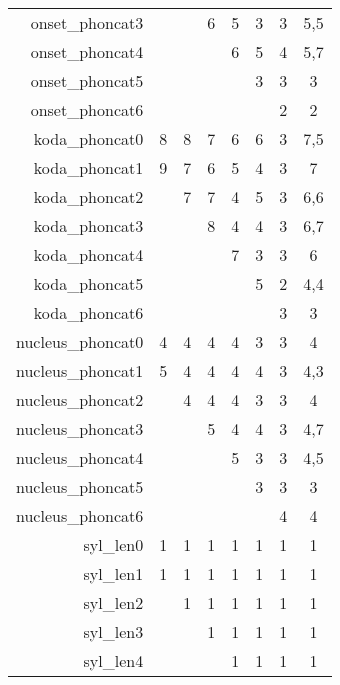 \begin{longtable}{|r|llllll|c|}
    onset\_phoncat3   & ~    & ~    & 6    & 5    & 3    & 3    & 5,5      \\
    onset\_phoncat4   & ~    & ~    & ~    & 6    & 5    & 4    & 5,7      \\
    onset\_phoncat5   & ~    & ~    & ~    & ~    & 3    & 3    & 3        \\
    onset\_phoncat6   & ~    & ~    & ~    & ~    & ~    & 2    & 2        \\
    koda\_phoncat0    & 8    & 8    & 7    & 6    & 6    & 3    & 7,5      \\
    koda\_phoncat1    & 9    & 7    & 6    & 5    & 4    & 3    & 7        \\
    koda\_phoncat2    & ~    & 7    & 7    & 4    & 5    & 3    & 6,6      \\
    koda\_phoncat3    & ~    & ~    & 8    & 4    & 4    & 3    & 6,7      \\
    koda\_phoncat4    & ~    & ~    & ~    & 7    & 3    & 3    & 6        \\
    koda\_phoncat5    & ~    & ~    & ~    & ~    & 5    & 2    & 4,4      \\
    koda\_phoncat6    & ~    & ~    & ~    & ~    & ~    & 3    & 3        \\
    nucleus\_phoncat0 & 4    & 4    & 4    & 4    & 3    & 3    & 4        \\
    nucleus\_phoncat1 & 5    & 4    & 4    & 4    & 4    & 3    & 4,3      \\
    nucleus\_phoncat2 & ~    & 4    & 4    & 4    & 3    & 3    & 4        \\
    nucleus\_phoncat3 & ~    & ~    & 5    & 4    & 4    & 3    & 4,7      \\
    nucleus\_phoncat4 & ~    & ~    & ~    & 5    & 3    & 3    & 4,5      \\
    nucleus\_phoncat5 & ~    & ~    & ~    & ~    & 3    & 3    & 3        \\
    nucleus\_phoncat6 & ~    & ~    & ~    & ~    & ~    & 4    & 4        \\
    syl\_len0         & 1    & 1    & 1    & 1    & 1    & 1    & 1        \\
    syl\_len1         & 1    & 1    & 1    & 1    & 1    & 1    & 1        \\
    syl\_len2         & ~    & 1    & 1    & 1    & 1    & 1    & 1        \\
    syl\_len3         & ~    & ~    & 1    & 1    & 1    & 1    & 1        \\
    syl\_len4         & ~    & ~    & ~    & 1    & 1    & 1    & 1        \\

\end{longtable}

